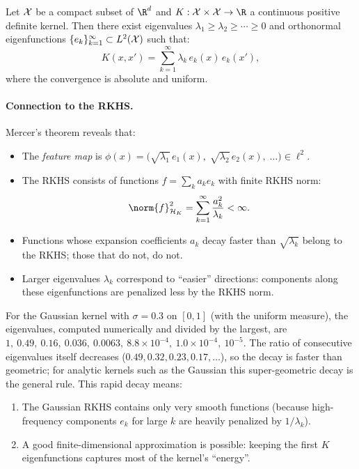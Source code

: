 \begin{notechapter}
\begin{theorem}
\label{rkhs:thm:mercer}
Let $\mathcal{X}$ be a compact subset of $\R^d$ and $K: \X \times \X \to \R$ a
continuous positive definite kernel. Then there exist eigenvalues
$\lambda_1 \geq \lambda_2 \geq \cdots \geq 0$ and orthonormal
eigenfunctions $\{e_k\}_{k=1}^\infty \subset L^2(\mathcal{X})$ such that:
\begin{equation}
\label{rkhs:eq:mercer}
K(x,x') = \sum_{k=1}^\infty \lambda_k\, e_k(x)\, e_k(x'),
\end{equation}
where the convergence is absolute and uniform.
\end{theorem}

\paragraph{Connection to the RKHS.} Mercer's theorem reveals that:
\begin{itemize}
  \item The \emph{feature map} is $\phi(x) =
  \bigl(\sqrt{\lambda_1}\,e_1(x),\; \sqrt{\lambda_2}\,e_2(x),\;
  \ldots\bigr) \in \ell^2$.
  \item The RKHS consists of functions $f = \sum_k a_k e_k$ with finite
  RKHS norm:
  \begin{equation}
  \norm{f}_{\hk}^2 = \sum_{k=1}^\infty \frac{a_k^2}{\lambda_k} < \infty.
  \end{equation}
  \item Functions whose expansion coefficients $a_k$ decay faster than
  $\sqrt{\lambda_k}$ belong to the RKHS; those that do not, do not.
  \item Larger eigenvalues $\lambda_k$ correspond to ``easier''
  directions: components along these eigenfunctions are penalized less
  by the RKHS norm.
\end{itemize}

\begin{example}
For the Gaussian kernel with $\sigma = 0.3$ on $[0,1]$ (with the uniform measure), the eigenvalues, computed numerically and divided by the largest, are $1,\ 0.49,\ 0.16,\ 0.036,\ 0.0063,\ 8.8\times10^{-4},\ 1.0\times10^{-4},\ 10^{-5}$. The ratio of consecutive eigenvalues itself decreases ($0.49, 0.32, 0.23, 0.17, \ldots$), so the decay is faster than geometric; for analytic kernels such as the Gaussian this super-geometric decay is the general rule. This rapid decay means:

\begin{enumerate}
  \item The Gaussian RKHS contains only very smooth functions (because
  high-frequency components $e_k$ for large $k$ are heavily penalized by
  $1/\lambda_k$).
  \item A good finite-dimensional approximation is possible: keeping the
  first $K$ eigenfunctions captures most of the kernel's ``energy''.
\end{enumerate}
\end{example}


\end{notechapter}
